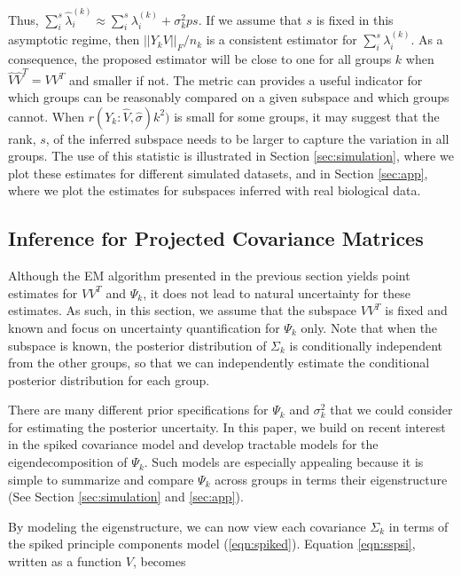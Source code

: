 \documentclass[12pt]{article}
\begin{document}
Thus,
$\sum_i^s \hat{\lambda}^{(k)}_i \approx \sum_i^s \lambda^{(k)}_i +
\sigma_k^2ps$.
If we assume that $s$ is fixed in this asymptotic regime, then
$||Y_kV||_F/n_k$ is a consistent estimator for
$\sum_i^s \lambda^{(k)}_i$.  As a consequence, the proposed estimator
will be close to one for all groups $k$ when $\hat{V}\hat{V}^T = VV^T$
and smaller if not.  The metric can provides a useful indicator for
which groups can be reasonably compared on a given subspace and which
groups cannot.  When $r(Y_k: \hat{V}, \hat{\sigma})k^2)$ is small for
some groups, it may suggest that the rank, $s$, of the inferred
subspace needs to be larger to capture the variation in all
groups. The use of this statistic is illustrated in Section
\ref{sec:simulation}, where we plot these estimates for different
simulated datasets, and in Section \ref{sec:app}, where we plot the
estimates for subspaces inferred with real biological data.

\subsection{Inference for Projected Covariance Matrices}
\label{sec:bayes}

Although the EM algorithm presented in the previous section yields
point estimates for $VV^T$ and $\Psi_k$, it does not lead to natural
uncertainty for these estimates. As such, in this section, we assume
that the subspace $VV^T$ is fixed and known and focus on uncertainty
quantification for $\Psi_k$ only.  Note that when the subspace is
known, the posterior distribution of $\Sigma_k$ is conditionally
independent from the other groups, so that we can independently
estimate the conditional posterior distribution for each group.

There are many different prior specifications for $\Psi_k$ and
$\sigma^2_k$ that we could consider for estimating the posterior
uncertaity.  In this paper, we build on recent interest in the spiked
covariance model \citep{Donoho2013, Paul2007} and develop tractable
models for the eigendecomposition of $\Psi_k$.  Such models are
especially appealing because it is simple to summarize and compare
$\Psi_k$ across groups in terms their eigenstructure (See Section
\ref{sec:simulation} and \ref{sec:app}).

By modeling the eigenstructure, we can now view each covariance
$\Sigma_k$ in terms of the spiked principle components model (\ref{eqn:spiked}).
Equation \ref{eqn:sspsi}, written as a function $V$, becomes
\end{document}

